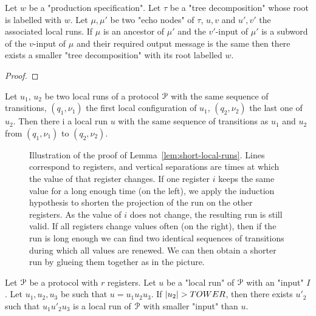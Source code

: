 \begin{lemma}
	Let $w$ be a "production specification".
	Let $\tau$ be a "tree decomposition" whose root is labelled with $w$.
	Let $\mu, \mu'$ be two "echo nodes" of $\tau$, $u, v$ and $u', v'$ the associated local runs.
	If $\mu$ is an ancestor of $\mu'$ and the $v'$-input of $\mu'$ is a subword of the $v$-input of $\mu$ and their required output message is the same then there exists a smaller "tree decomposition" with its root labelled $w$.  
\end{lemma}

\begin{proof}
\end{proof}

\begin{lemma}
	Let $u_1$, $u_2$ be two local runs of a protocol $\mathcal{P}$ with the same sequence of transitions, $(q_1, \nu_1)$ the first local configuration of $u_1$, $(q_2, \nu_2)$ the last one of $u_2$. Then there i a local run $u$ with the same sequence of transitions as $u_1$ and $u_2$ from $(q_1, \nu_1)$ to $(q_2, \nu_2)$. 
\end{lemma}

\begin{figure}
	
	\caption{Illustration of the proof of Lemma~\ref{lem:short-local-runs}. Lines correspond to registers, and vertical separations are times at which the value of that register changes. If one register $i$ keeps the same value for a long enough time (on the left), we apply the induction hypothesis to shorten the projection of the run on the other registers. As the value of $i$ does not change, the resulting run is still valid. If all registers change values often (on the right), then if the run is long enough we can find two identical sequences of transitions during which all values are renewed. We can then obtain a shorter run by glueing them together as in the picture.}
\end{figure}




\begin{lemma}
	\label{lem:short-local-runs}
	Let $\mathcal{P}$ be a protocol with $r$ registers.
	Let $u$ be a "local run" of $\mathcal{P}$ with an "input" $I$.
	Let $u_1, u_2, u_3$ be such that $u=u_1u_2u_3$.
	If $|u_2| > TOWER$, then there exists $u'_2$ such that $u_1u'_2u_3$ is a local run of $\mathcal{P}$ with smaller "input" than $u$. 
\end{lemma}

